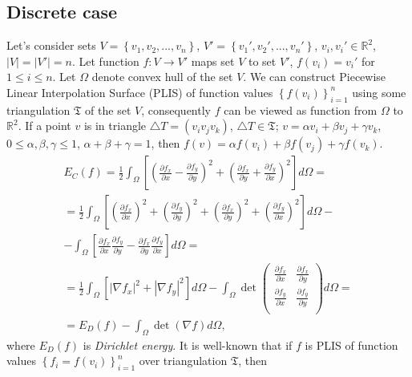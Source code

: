 \documentclass{article}
\begin{document}
\subsection{Discrete case}
\label{sec:discrete}
Let's consider sets $V = \left\{v_1, v_2, ... , v_n\right\}$, $V' = \left\{v_1', v_2', ... , v_n'\right\}$, $v_i, v_i' \in \mathbb{R}^2$, $|V| = |V'| = n$. Let function $f: V \to V'$ maps set $V$ to set $V'$, 
$f(v_i) = v_i'$ for $1 \le i \le n$. Let $\Omega$ denote convex hull of the set $V$. We can construct Piecewise Linear Interpolation Surface (PLIS) of function values $\left\{f(v_i)\right\}_{i=1}^n$ 
using some triangulation $\mathfrak{T}$ of the set $V$, consequently $f$ can be viewed as function from $\Omega$ to~$\mathbb{R}^2$. If a point $v$ is in triangle $\triangle T = (v_i v_j v_k)$, $\triangle T \in \mathfrak{T}$; 
$v = \alpha v_i + \beta v_j + \gamma v_k$, $0 \le \alpha, \beta, \gamma \le 1$, $\alpha + \beta + \gamma = 1$, then $f(v) = \alpha f(v_i) + \beta f(v_j) + \gamma f(v_k)$.
\begin{multline}
\label{formula:EC}
  E_C(f) =
  \frac{1}{2} \int_{\Omega}\left[{\left(\frac{\partial f_x}{\partial x} - \frac{\partial f_y}{\partial y}\right)^2 + \left(\frac{\partial f_x}{\partial y} + \frac{\partial f_y}{\partial x}\right)^2}\right] d\Omega = \\
  = \frac{1}{2} \int_{\Omega}\left[\left(\frac{\partial f_x}{\partial x}\right)^2 + \left(\frac{\partial f_y}{\partial y}\right)^2 + \left(\frac{\partial f_x}{\partial y}\right)^2 + 
  \left(\frac{\partial f_y}{\partial x}\right)^2 \right] d\Omega - \\
  - \int_{\Omega}\left[\frac{\partial f_x}{\partial x} \frac{\partial f_y}{\partial y} - \frac{\partial f_x}{\partial y} \frac{\partial f_y}{\partial x}\right] d\Omega = \\
  = \frac{1}{2} \int_{\Omega} \left[ \left| \nabla f_x \right| ^ 2 + \left| \nabla f_y \right| ^ 2 \right] d\Omega - \int_{\Omega} \det {\begin{pmatrix} 
    \frac{\partial f_x}{\partial x} & \frac{\partial f_x}{\partial y} \\
    \frac{\partial f_y}{\partial x} & \frac{\partial f_y}{\partial y} \\
  \end{pmatrix}} d\Omega = \\
  = E_D(f) - \int_{\Omega} \det (\nabla f) d\Omega,
\end{multline}
where $E_D(f)$ is \textit{Dirichlet energy}. It is well-known \cite{Pinkall93} that if $f$ is PLIS of function values $\left\{f_i = f(v_i)\right\}_{i=1}^n$ over triangulation $\mathfrak{T}$, then  
\end{document}
